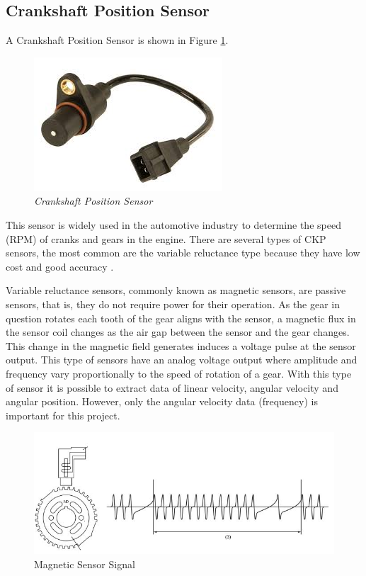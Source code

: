 \subsection{Crankshaft Position Sensor}
	
	A Crankshaft Position Sensor is shown in Figure \ref{fig-ckpReal}.

	\begin{figure}[htbp]
		\centering
			\includegraphics[scale=0.8]{figuras/fig-ckp-real.jpg}
		\caption{\textit{Crankshaft Position Sensor} \cite{ckp-gm}}
		\label{fig-ckpReal}
	\end{figure}

	This sensor is widely used in the automotive industry to determine the speed (RPM) of cranks and gears in the engine. There are several types of CKP sensors, the most common are the variable reluctance type because they have low cost and good accuracy \cite{schroeder2002crankshaft}.
	\par
	Variable reluctance sensors, commonly known as magnetic sensors, are passive sensors, that is, they do not require power for their operation. As the gear in question rotates each tooth of the gear aligns with the sensor, a magnetic flux in the sensor coil changes as the air gap between the sensor and the gear changes. This change in the magnetic field generates induces a voltage pulse at the sensor output. This type of sensors have an analog voltage output where amplitude and frequency vary proportionally to the speed of rotation of a gear. With this type of sensor it is possible to extract data of linear velocity, angular velocity and angular position. However, only the angular velocity data (frequency) is important for this project.

	\begin{figure}[htbp]
		\centering
			\includegraphics[scale=0.6]{figuras/fig-ckp-signal.png}
		\caption{Magnetic Sensor Signal \cite{cam-sensor-signal}}
		\label{fig-ckpSignal}
	\end{figure}
